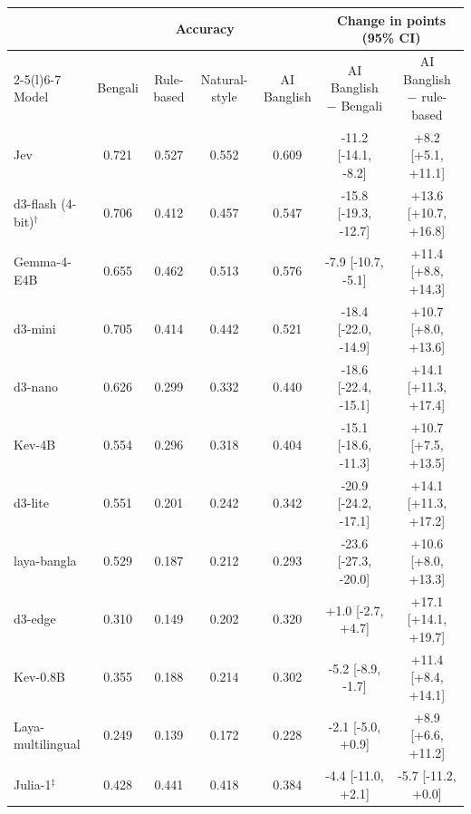 \begin{tabular}{@{}lcccccc@{}}\toprule
 & \multicolumn{4}{c}{Accuracy} & \multicolumn{2}{c}{Change in points (95\% CI)} \\\cmidrule(lr){2-5}\cmidrule(l){6-7}
Model & Bengali & Rule-based & Natural-style & AI Banglish & AI Banglish $-$ Bengali & AI Banglish $-$ rule-based \\\midrule
Jev & 0.721 & 0.527 & 0.552 & 0.609 & -11.2 [-14.1, -8.2] & +8.2 [+5.1, +11.1] \\
d3-flash (4-bit)$^\dagger$ & 0.706 & 0.412 & 0.457 & 0.547 & -15.8 [-19.3, -12.7] & +13.6 [+10.7, +16.8] \\
Gemma-4-E4B & 0.655 & 0.462 & 0.513 & 0.576 & -7.9 [-10.7, -5.1] & +11.4 [+8.8, +14.3] \\
d3-mini & 0.705 & 0.414 & 0.442 & 0.521 & -18.4 [-22.0, -14.9] & +10.7 [+8.0, +13.6] \\
d3-nano & 0.626 & 0.299 & 0.332 & 0.440 & -18.6 [-22.4, -15.1] & +14.1 [+11.3, +17.4] \\
Kev-4B & 0.554 & 0.296 & 0.318 & 0.404 & -15.1 [-18.6, -11.3] & +10.7 [+7.5, +13.5] \\
d3-lite & 0.551 & 0.201 & 0.242 & 0.342 & -20.9 [-24.2, -17.1] & +14.1 [+11.3, +17.2] \\
laya-bangla & 0.529 & 0.187 & 0.212 & 0.293 & -23.6 [-27.3, -20.0] & +10.6 [+8.0, +13.3] \\
d3-edge & 0.310 & 0.149 & 0.202 & 0.320 & +1.0 [-2.7, +4.7] & +17.1 [+14.1, +19.7] \\
Kev-0.8B & 0.355 & 0.188 & 0.214 & 0.302 & -5.2 [-8.9, -1.7] & +11.4 [+8.4, +14.1] \\
Laya-multilingual & 0.249 & 0.139 & 0.172 & 0.228 & -2.1 [-5.0, +0.9] & +8.9 [+6.6, +11.2] \\
Julia-1$^\ddagger$ & 0.428 & 0.441 & 0.418 & 0.384 & -4.4 [-11.0, +2.1] & -5.7 [-11.2, +0.0] \\
\bottomrule\end{tabular}
